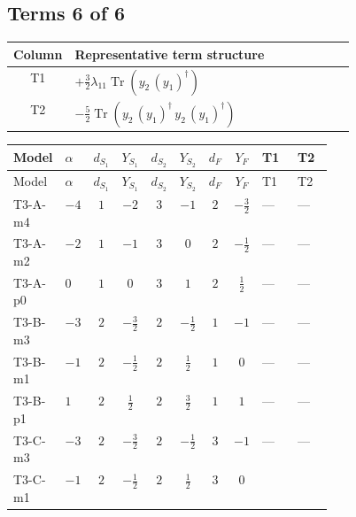 \documentclass[8pt]{article}
\begin{document}
\begin{landscape}
\subsection*{Terms 6 of 6}
\begin{center}
\begin{tabular}{@{}c >{\raggedright\arraybackslash}p{0.82\linewidth}@{}}
\toprule
Column & Representative term structure \\
\midrule
T1 & \(\displaystyle +\frac{3}{2} {\lambda_{11}} \operatorname{Tr}\!\left({y_2}\,\left({y_1}\right)^{\dagger}\right)\) \\
\midrule
T2 & \(\displaystyle -\frac{5}{2} \operatorname{Tr}\!\left({y_2}\,\left({y_1}\right)^{\dagger}\,{y_2}\,\left({y_1}\right)^{\dagger}\right)\) \\
\midrule
\bottomrule
\end{tabular}
\end{center}
\smallskip
\tiny
\begin{longtable}{@{}llcccccc >{\raggedright\arraybackslash}p{0.21\linewidth} >{\raggedright\arraybackslash}p{0.21\linewidth}@{}}
\toprule
Model & $\alpha$ & $d_{S_1}$ & $Y_{S_1}$ & $d_{S_2}$ & $Y_{S_2}$ & $d_F$ & $Y_F$ & T1 & T2 \\
\midrule
\endfirsthead
\toprule
Model & $\alpha$ & $d_{S_1}$ & $Y_{S_1}$ & $d_{S_2}$ & $Y_{S_2}$ & $d_F$ & $Y_F$ & T1 & T2 \\
\midrule
\endhead
T3-A-m4 & $-4$ & $1$ & $-2$ & $3$ & $-1$ & $2$ & $-\frac{3}{2}$ & --- & --- \\
\midrule
T3-A-m2 & $-2$ & $1$ & $-1$ & $3$ & $0$ & $2$ & $-\frac{1}{2}$ & --- & --- \\
\midrule
T3-A-p0 & $0$ & $1$ & $0$ & $3$ & $1$ & $2$ & $\frac{1}{2}$ & --- & --- \\
\midrule
T3-B-m3 & $-3$ & $2$ & $-\frac{3}{2}$ & $2$ & $-\frac{1}{2}$ & $1$ & $-1$ & --- & --- \\
\midrule
T3-B-m1 & $-1$ & $2$ & $-\frac{1}{2}$ & $2$ & $\frac{1}{2}$ & $1$ & $0$ & --- & --- \\
\midrule
T3-B-p1 & $1$ & $2$ & $\frac{1}{2}$ & $2$ & $\frac{3}{2}$ & $1$ & $1$ & --- & --- \\
\midrule
T3-C-m3 & $-3$ & $2$ & $-\frac{3}{2}$ & $2$ & $-\frac{1}{2}$ & $3$ & $-1$ & --- & --- \\
\midrule
T3-C-m1 & $-1$ & $2$ & $-\frac{1}{2}$ & $2$ & $\frac{1}{2}$ & $3$ & $0$ & \scriptsize\adjustbox{max width=\linewidth}{$\begin{gathered} +\frac{3}{2} {\lambda_{11}} \operatorname{Tr}\!\left({y_2}\,\left({y_1}\right)^{\dagger}\right)\end{gathered}$} & \scriptsize\adjustbox{max width=\linewidth}{$\begin{gathered} -\frac{5}{2} \operatorname{Tr}\!\left({y_2}\,\left({y_1}\right)^{\dagger}\,{y_2}\,\left({y_1}\right)^{\dagger}\right)\end{gathered}$} \\

\end{longtable}
\end{landscape}
\end{document}
